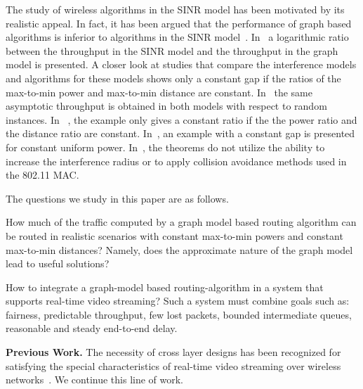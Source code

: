 \documentclass[11pt]{article}
\newenvironment{proof sketch}[1]{\noindent {\emph{Proof sketch of #1:}}}{\hfill \qed}
\newcommand{\SNR}{\text{\sc{snr}}}
\newcommand{\MCS}{\text{\sc{mcs}}}
\begin{document}
The study of wireless algorithms in the SINR model has been motivated
by its realistic appeal. In fact, it has been argued that the
performance of graph based algorithms is inferior to algorithms in the
SINR model~\cite{goussevskaia2007complexity}.
In~\cite{moscibroda2006protocol,moscibroda2006topology} a logarithmic
ratio between the throughput in the SINR model and the throughput in
the graph model is presented.  A closer look at studies that compare
the interference models and algorithms for these models shows only a
constant gap if the ratios of the max-to-min power and max-to-min
distance are constant.  In~\cite{gupta2000capacity} the same
asymptotic throughput is obtained in both models with respect to
random instances. In ~\cite{moscibroda2006protocol}, the example only
gives a constant ratio if the the power ratio and the distance ratio
are constant.  In~\cite{ChafekarCapacity}, an example with a constant
gap is presented for constant uniform power.
In~\cite{behzad2004performance}, the theorems do not utilize the
ability to increase the interference radius or to apply collision
avoidance methods used in the 802.11 MAC.

The questions we study in this paper are as follows.
\begin{inparaenum}[(i)]
\item How much of the traffic computed by a graph model based routing
  algorithm can be routed in realistic scenarios with constant
  max-to-min powers and constant max-to-min distances? Namely, does
  the approximate nature of the graph model lead to useful solutions?
\item How to integrate a graph-model based routing-algorithm in a
  system that supports real-time video streaming? Such a system must
  combine goals such as: fairness, predictable throughput, few lost
  packets, bounded intermediate queues, reasonable and steady
  end-to-end delay.
\end{inparaenum}

\medskip
\noindent
\textbf{Previous Work.}  The necessity of cross layer designs has been
recognized for satisfying the special characteristics of real-time
video streaming over wireless
networks~\cite{shan2005cross,setton2005cross,khan2006application}.  We
continue this line of work.

\end{document}
